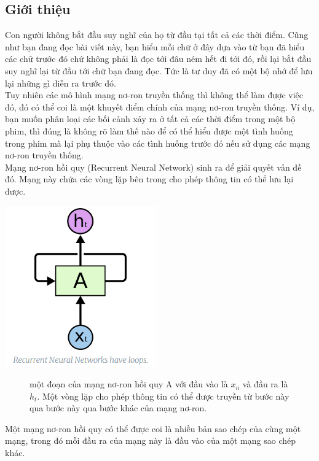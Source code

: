 \subsection{Giới thiệu}
Con người không bắt đầu suy nghĩ của họ từ đầu tại tất cả các thời điểm. Cũng như bạn đang đọc bài viết này, bạn hiểu mỗi chữ ở đây dựa vào từ bạn đã hiểu các chữ trước đó chứ không phải là đọc tới đâu ném hết đi tới đó, rồi lại bắt đầu suy nghĩ lại từ đầu tới chữ bạn đang đọc. Tức là tư duy đã có một bộ nhớ để lưu lại những gì diễn ra trước đó.\\
Tuy nhiên các mô hình mạng nơ-ron truyền thống thì không thể làm được việc đó, đó có thể coi là một khuyết điểm chính của mạng nơ-ron truyền thống. Ví dụ, bạn muốn phân loại các bối cảnh xảy ra ở tất cả các thời điểm trong một bộ phim, thì đúng là không rõ làm thế nào để có thể hiểu được một tình huống trong phim mà lại phụ thuộc vào các tình huống trước đó nếu sử dụng các mạng nơ-ron truyền thống.\\
Mạng nơ-ron hồi quy (Recurrent Neural Network) sinh ra để giải quyết vấn đề đó. Mạng này chứa các vòng lặp bên trong cho phép thông tin có thể lưu lại được.
\begin{center}
    \includegraphics[scale=.5]{image/chapter6/RNN-node.png}
    \begin{figure}[htp]
    \begin{center}
    \end{center}
    \caption{một đoạn của mạng nơ-ron hồi quy A với đầu vào là $x_{n}$ và đầu ra là $h_{t}$. Một vòng lặp cho phép thông tin có thể được truyền từ bước này qua bước này qua bước khác của mạng nơ-ron. \cite{rnn-basic}}
    \end{figure}
\end{center}
Một mạng nơ-ron hồi quy có thể được coi là nhiều bản sao chép của cùng một mạng, trong đó mỗi đầu ra của mạng này là đầu vào của một mạng sao chép khác.\par
